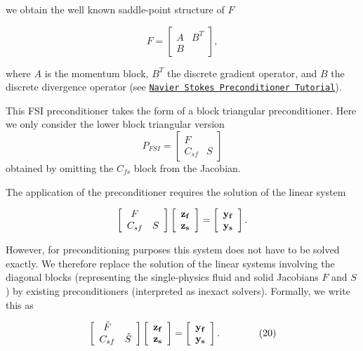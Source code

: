 we obtain the well known saddle-\/point structure of $F$

\[ F= \left[ \begin{array}{cc} A&B^T\\ B& \end{array} \right], \]

where $A$ is the momentum block, $B^T$ the discrete gradient operator, and $B$ the discrete divergence operator (see \href{../../../preconditioners/lsc_navier_stokes/html/index.html}{\tt Navier Stokes Preconditioner Tutorial}).

This F\+SI preconditioner takes the form of a block triangular preconditioner. Here we only consider the lower block triangular version \[ P_{FSI}= \left[ \begin{array}{cc} F& \\ C_{sf}&S \end{array} \right] \] obtained by omitting the $C_{fs}$ block from the Jacobian.

The application of the preconditioner requires the solution of the linear system

\[ \left[ \begin{array}{cc} F& \\ C_{sf}&S \end{array} \right] \left[ \begin{array}{c} \bf z_f\\ \bf z_s \end{array} \right] = \left[ \begin{array}{c} \bf y_f\\ \bf y_s \end{array} \right]. \]

However, for preconditioning purposes this system does not have to be solved exactly. We therefore replace the solution of the linear systems involving the diagonal blocks (representing the single-\/physics fluid and solid Jacobians $F$ and $S$) by existing preconditioners (interpreted as inexact solvers). Formally, we write this as

\[ \left[ \begin{array}{cc} \tilde F& \\ C_{sf}&\tilde S \end{array} \right] \left[ \begin{array}{c} \bf z_f\\ \bf z_s \end{array} \right] = \left[ \begin{array}{c} \bf y_f\\ \bf y_s \end{array} \right] . \ \ \ \ \ \ \ \ \ \ \ \ (20) \]

